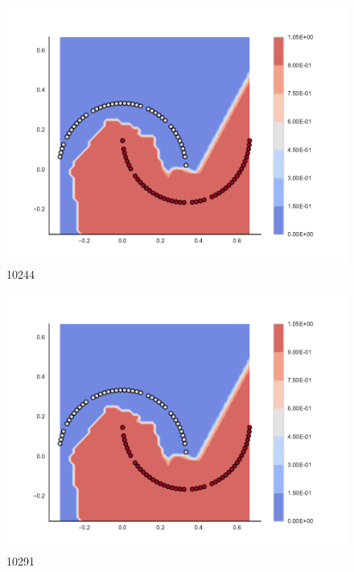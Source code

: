 \begin{subfigure}[b]{0.09\textwidth}
    \includegraphics[clip, trim=2.35cm 1.75cm 4.5cm 0cm,width=\textwidth]{img/convergence/10244.pdf}
    \caption{10244}
    \label{fig:convergence_10244}
\end{subfigure}
%
\begin{subfigure}[b]{0.09\textwidth}
    \includegraphics[clip, trim=2.35cm 1.75cm 4.5cm 0cm,width=\textwidth]{img/convergence/10291.pdf}
    \caption{10291}
    \label{fig:convergence_10291}
\end{subfigure}
%
